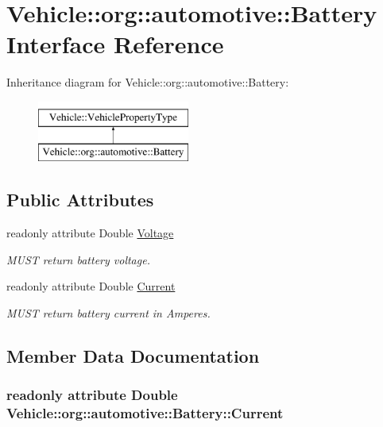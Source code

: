 \hypertarget{interfaceVehicle_1_1org_1_1automotive_1_1Battery}{\section{Vehicle\-:\-:org\-:\-:automotive\-:\-:Battery Interface Reference}
\label{interfaceVehicle_1_1org_1_1automotive_1_1Battery}
}
Inheritance diagram for Vehicle\-:\-:org\-:\-:automotive\-:\-:Battery\-:\begin{figure}[H]
\begin{center}
\leavevmode
\includegraphics[height=2.000000cm]{interfaceVehicle_1_1org_1_1automotive_1_1Battery}
\end{center}
\end{figure}
\subsection*{Public Attributes}
\begin{DoxyCompactItemize}
\item 
readonly attribute Double \hyperlink{interfaceVehicle_1_1org_1_1automotive_1_1Battery_a360c66a17c91cce2b32d7cd0819635f9}{Voltage}
\begin{DoxyCompactList}\small\item\em M\-U\-S\-T return battery voltage. \end{DoxyCompactList}\item 
readonly attribute Double \hyperlink{interfaceVehicle_1_1org_1_1automotive_1_1Battery_a0ee66dda24679629c5696b8cc86cc15f}{Current}
\begin{DoxyCompactList}\small\item\em M\-U\-S\-T return battery current in Amperes. \end{DoxyCompactList}\end{DoxyCompactItemize}


\subsection{Member Data Documentation}
\hypertarget{interfaceVehicle_1_1org_1_1automotive_1_1Battery_a0ee66dda24679629c5696b8cc86cc15f}{
\subsubsection[{Current}]{\setlength{\rightskip}{0pt plus 5cm}readonly attribute Double Vehicle\-::org\-::automotive\-::\-Battery\-::\-Current}}\label{interfaceVehicle_1_1org_1_1automotive_1_1Battery_a0ee66dda24679629c5696b8cc86cc15f}


